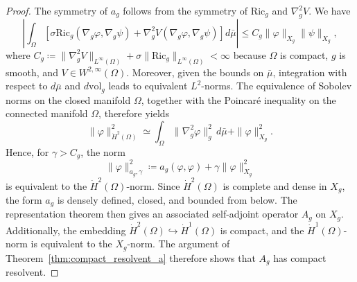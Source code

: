 \documentclass[11pt]{article}
\numberwithin{equation}{section}
\theoremstyle{definition}
\newcommand{\vol}{\mathrm{vol}}
\newcommand{\dotHk}[1][k]{\dot{H}^{#1}}
\begin{document}
\begin{proof}
    The symmetry of $a_g$ follows from the symmetry of $\mathrm{Ric}_g$ and $\nabla_g^2 V$.
    We have
    \[
    \left|\int_\Omega \left[\sigma\mathrm{Ric}_g(\nabla_g \varphi, \nabla_g \psi) + \nabla_g^2 V(\nabla_g \varphi, \nabla_g \psi) \right] d\bar\mu \right| \leq C_g \|\varphi\|_{X_g} \|\psi\|_{X_g},
    \]
    where $C_g \coloneqq \|\nabla_g^2 V\|_{L^\infty(\Omega)} + \sigma\|\mathrm{Ric}_g\|_{L^{\infty}(\Omega)} < \infty$ because $\Omega$ is compact, $g$ is smooth, and $V \in W^{2,\infty}(\Omega)$.
    Moreover, given the bounds on $\bar\mu$, integration with respect to $d\bar\mu$ and $d\vol_g$ leads to equivalent $L^2$-norms.
    The equivalence of Sobolev norms on the closed manifold $\Omega$, together with the Poincaré inequality on the connected manifold $\Omega$, therefore yields
    \[
    \|\varphi\|_{\dotHk[2](\Omega)}^2 \simeq \int_{\Omega} \|\nabla_g^2 \varphi\|_g^2 \, d\bar\mu + \|\varphi\|_{X_g}^2.
    \]
    Hence, for $\gamma > C_g$, the norm
    \[
    \|\varphi\|_{a_g, \gamma}^2 \coloneqq a_g(\varphi,\varphi) + \gamma\|\varphi\|_{X_g}^2
    \]
    is equivalent to the $\dotHk[2](\Omega)$-norm. 
    Since $\dotHk[2](\Omega)$ is complete and dense in $X_g$, the form $a_g$ is densely defined, closed, and bounded from below. 
    The representation theorem then gives an associated self-adjoint operator $A_g$ on $X_g$.
    Additionally, the embedding $\dotHk[2](\Omega) \hookrightarrow \dotHk[1](\Omega)$ is compact, and the $\dotHk[1](\Omega)$-norm is equivalent to the $X_g$-norm. 
    The argument of Theorem~\ref{thm:compact_resolvent_a} therefore shows that $A_g$ has compact resolvent.


\end{proof}
\end{document}
